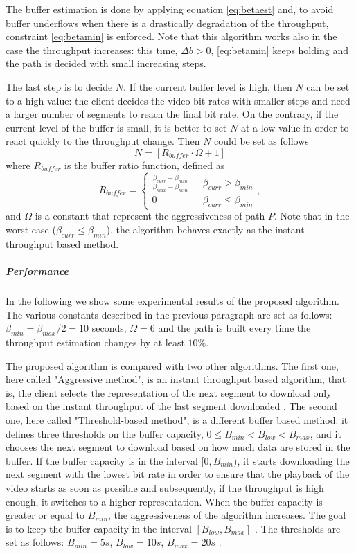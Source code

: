 \documentclass[openany]{book}
\begin{document}
The buffer estimation is done by applying equation \ref{eq:betaest} and, to avoid buffer underflows when there is a drastically degradation of the throughput, constraint \ref{eq:betamin} is enforced. Note that this algorithm works also in the case the throughput increases: this time, $\Delta b>0$, \ref{eq:betamin} keeps holding and the path is decided with small increasing steps.  

The last step is to decide $N$. If the current buffer level is high, then $N$ can be set to a high value: the client decides the video bit rates with smaller steps and need a larger number of segments to reach the final bit rate. On the contrary, if the current level of the buffer is small, it is better to set $N$ at a low value in order to react quickly to the throughput change. Then $N$ could be set as follows
\begin{equation*}
N = \left[R_{buffer}\cdot\Omega + 1\right]
\end{equation*}
where $R_{buffer}$ is the buffer ratio function, defined as
\begin{equation*}
R_{buffer}=\begin{cases}
\frac{\beta_{curr} - \beta_{min}}{\beta_{max} - \beta_{min}}\ \ \  &\beta_{curr} > \beta_{min} \\
0 &\beta_{curr}\leq\beta_{min}
\end{cases},
\end{equation*}
and $\Omega$ is a constant that represent the aggressiveness of path $P$. Note that in the worst case ($\beta_{curr}\leq\beta_{min}$), the algorithm behaves exactly as the instant throughput based method.

\subparagraph*{Performance} In the following we show some experimental results of the proposed algorithm. The various constants described in the previous paragraph are set as follows: $\beta_{min}=\beta_{max}/2=10$ seconds, $\Omega = 6$ and the path is built every time the throughput estimation changes by at least $10\%$. 

The proposed algorithm is compared with two other algorithms. The first one, here called "Aggressive method", is an instant throughput based algorithm, that is, the client selects the representation of the next segment to download only based on the instant throughput of the last segment downloaded \cite{buffercomparison}. The second one, here called "Threshold-based method", is a different buffer based method: it defines three thresholds on the buffer capacity, $0\leq B_{min} < B_{low} < B_{max}$, and it chooses the next segment to download based on how much data are stored in the buffer. If the buffer capacity is in the interval $[0, B_{min})$, it starts downloading the next segment with the lowest bit rate in order to ensure that the playback of the video starts as soon as possible and subsequently, if the throughput is high enough, it switches to a higher representation. When the buffer capacity is greater or equal to $B_{min}$, the aggressiveness of the algorithm increases. The goal is to keep the buffer capacity in the interval $[B_{low}, B_{max}]$ \cite{buffercomparison}. The thresholds are set as follows: $B_{min}=5 s$, $B_{low}=10 s$, $B_{max}=20 s$ \cite{buffer}.
\end{document}
